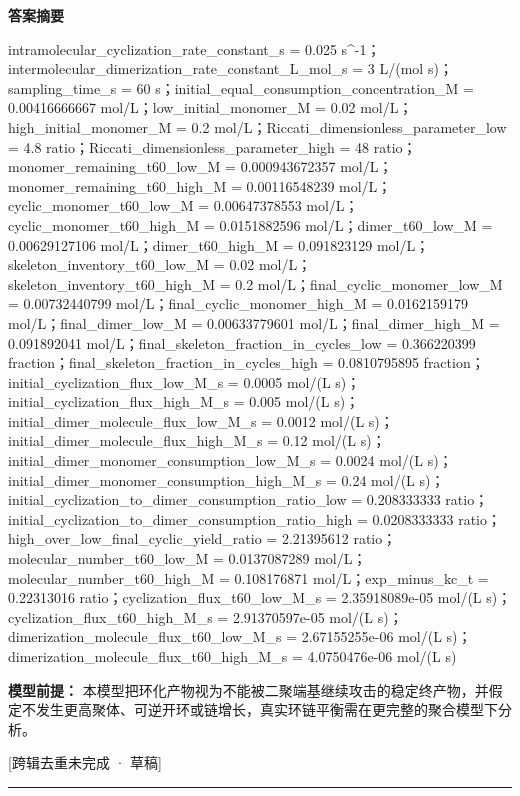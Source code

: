 \documentclass[UTF8,11pt,a4paper]{ctexart}
\begin{document}
\noindent\textbf{答案摘要}\par
intramolecular\_cyclization\_rate\_constant\_s = 0.025 s\textasciicircum{}-1；intermolecular\_dimerization\_rate\_constant\_L\_mol\_s = 3 L/(mol s)；sampling\_time\_s = 60 s；initial\_equal\_consumption\_concentration\_M = 0.00416666667 mol/L；low\_initial\_monomer\_M = 0.02 mol/L；high\_initial\_monomer\_M = 0.2 mol/L；Riccati\_dimensionless\_parameter\_low = 4.8 ratio；Riccati\_dimensionless\_parameter\_high = 48 ratio；monomer\_remaining\_t60\_low\_M = 0.000943672357 mol/L；monomer\_remaining\_t60\_high\_M = 0.00116548239 mol/L；cyclic\_monomer\_t60\_low\_M = 0.00647378553 mol/L；cyclic\_monomer\_t60\_high\_M = 0.0151882596 mol/L；dimer\_t60\_low\_M = 0.00629127106 mol/L；dimer\_t60\_high\_M = 0.091823129 mol/L；skeleton\_inventory\_t60\_low\_M = 0.02 mol/L；skeleton\_inventory\_t60\_high\_M = 0.2 mol/L；final\_cyclic\_monomer\_low\_M = 0.00732440799 mol/L；final\_cyclic\_monomer\_high\_M = 0.0162159179 mol/L；final\_dimer\_low\_M = 0.00633779601 mol/L；final\_dimer\_high\_M = 0.091892041 mol/L；final\_skeleton\_fraction\_in\_cycles\_low = 0.366220399 fraction；final\_skeleton\_fraction\_in\_cycles\_high = 0.0810795895 fraction；initial\_cyclization\_flux\_low\_M\_s = 0.0005 mol/(L s)；initial\_cyclization\_flux\_high\_M\_s = 0.005 mol/(L s)；initial\_dimer\_molecule\_flux\_low\_M\_s = 0.0012 mol/(L s)；initial\_dimer\_molecule\_flux\_high\_M\_s = 0.12 mol/(L s)；initial\_dimer\_monomer\_consumption\_low\_M\_s = 0.0024 mol/(L s)；initial\_dimer\_monomer\_consumption\_high\_M\_s = 0.24 mol/(L s)；initial\_cyclization\_to\_dimer\_consumption\_ratio\_low = 0.208333333 ratio；initial\_cyclization\_to\_dimer\_consumption\_ratio\_high = 0.0208333333 ratio；high\_over\_low\_final\_cyclic\_yield\_ratio = 2.21395612 ratio；molecular\_number\_t60\_low\_M = 0.0137087289 mol/L；molecular\_number\_t60\_high\_M = 0.108176871 mol/L；exp\_minus\_kc\_t = 0.22313016 ratio；cyclization\_flux\_t60\_low\_M\_s = 2.35918089e-05 mol/(L s)；cyclization\_flux\_t60\_high\_M\_s = 2.91370597e-05 mol/(L s)；dimerization\_molecule\_flux\_t60\_low\_M\_s = 2.67155255e-06 mol/(L s)；dimerization\_molecule\_flux\_t60\_high\_M\_s = 4.0750476e-06 mol/(L s)\par
\noindent\textbf{模型前提：}
本模型把环化产物视为不能被二聚端基继续攻击的稳定终产物，并假定不发生更高聚体、可逆开环或链增长，真实环链平衡需在更完整的聚合模型下分析。\par
\noindent\textcolor{red!65!black}{[跨辑去重未完成 · 草稿]} \par
\medskip\hrule\medskip
{}
\end{document}

